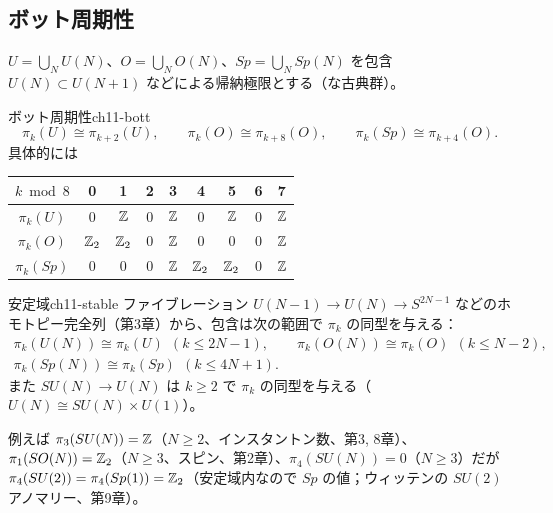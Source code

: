 \subsection{ボット周期性}
$U=\bigcup_NU(N)$、$O=\bigcup_NO(N)$、$Sp=\bigcup_NSp(N)$ を包含 $U(N)\subset U(N+1)$ などによる帰納極限とする（な古典群）。

\begin{mythm}{ボット周期性}{ch11-bott}
\[
\pi_k(U)\cong\pi_{k+2}(U),\qquad \pi_k(O)\cong\pi_{k+8}(O),\qquad \pi_k(Sp)\cong\pi_{k+4}(O).
\]
具体的には
\begin{center}
\begin{tabular}{c|cccccccc}
$k\bmod 8$ & 0 & 1 & 2 & 3 & 4 & 5 & 6 & 7\\ \hline
$\pi_k(U)$ & 0 & $\mathbb{Z}$ & 0 & $\mathbb{Z}$ & 0 & $\mathbb{Z}$ & 0 & $\mathbb{Z}$\\
$\pi_k(O)$ & $\mathbb{Z}_2$ & $\mathbb{Z}_2$ & 0 & $\mathbb{Z}$ & 0 & 0 & 0 & $\mathbb{Z}$\\
$\pi_k(Sp)$ & 0 & 0 & 0 & $\mathbb{Z}$ & $\mathbb{Z}_2$ & $\mathbb{Z}_2$ & 0 & $\mathbb{Z}$
\end{tabular}
\end{center}
\end{mythm}

\begin{myprop}{安定域}{ch11-stable}
ファイブレーション $U(N-1)\to U(N)\to S^{2N-1}$ などのホモトピー完全列（第3章）から、包含は次の範囲で $\pi_k$ の同型を与える：
\begin{gather*}
\pi_k(U(N))\cong\pi_k(U)\ \ (k\le2N-1),\qquad \pi_k(O(N))\cong\pi_k(O)\ \ (k\le N-2),\\
\pi_k(Sp(N))\cong\pi_k(Sp)\ \ (k\le4N+1).
\end{gather*}
また $SU(N)\to U(N)$ は $k\ge2$ で $\pi_k$ の同型を与える（$U(N)\cong SU(N)\times U(1)$）。
\end{myprop}
例えば $\pi_3(SU(N))=\mathbb{Z}$（$N\ge2$、インスタントン数、第3, 8章）、$\pi_1(SO(N))=\mathbb{Z}_2$（$N\ge3$、スピン、第2章）、$\pi_4(SU(N))=0$（$N\ge3$）だが $\pi_4(SU(2))=\pi_4(Sp(1))=\mathbb{Z}_2$（安定域内なので $Sp$ の値；ウィッテンの $SU(2)$ アノマリー、第9章）。

